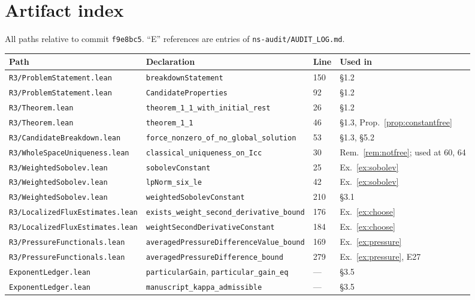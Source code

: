 \documentclass[11pt]{article}
\newcommand{\ct}[1]{\texttt{#1}}
\newcommand{\file}[1]{\texttt{\small #1}}
\theoremstyle{plain}
\theoremstyle{definition}
\theoremstyle{remark}
\begin{document}
\appendix
\section{Artifact index}

All paths relative to commit \texttt{f9e8bc5}. ``E'' references are entries of
\file{ns-audit/AUDIT\_LOG.md}.

\begin{center}
\small
\begin{tabular}{@{}llll@{}}
\toprule
Path & Declaration & Line & Used in \\
\midrule
\file{R3/ProblemStatement.lean} & \ct{breakdownStatement} & 150 & \S1.2 \\
\file{R3/ProblemStatement.lean} & \ct{CandidateProperties} & 92 & \S1.2 \\
\file{R3/Theorem.lean} & \ct{theorem\_1\_1\_with\_initial\_rest} & 26 & \S1.2 \\
\file{R3/Theorem.lean} & \ct{theorem\_1\_1} & 46 & \S1.3, Prop.~\ref{prop:constantfree} \\
\file{R3/CandidateBreakdown.lean} & \ct{force\_nonzero\_of\_no\_global\_solution} & 53 & \S1.3, \S5.2 \\
\file{R3/WholeSpaceUniqueness.lean} & \ct{classical\_uniqueness\_on\_Icc} & 30 & Rem.~\ref{rem:notfree}; used at 60, 64 \\
\file{R3/WeightedSobolev.lean} & \ct{sobolevConstant} & 25 & Ex.~\ref{ex:sobolev} \\
\file{R3/WeightedSobolev.lean} & \ct{lpNorm\_six\_le} & 42 & Ex.~\ref{ex:sobolev} \\
\file{R3/WeightedSobolev.lean} & \ct{weightedSobolevConstant} & 210 & \S3.1 \\
\file{R3/LocalizedFluxEstimates.lean} & \ct{exists\_weight\_second\_derivative\_bound} & 176 & Ex.~\ref{ex:choose} \\
\file{R3/LocalizedFluxEstimates.lean} & \ct{weightSecondDerivativeConstant} & 184 & Ex.~\ref{ex:choose} \\
\file{R3/PressureFunctionals.lean} & \ct{averagedPressureDifferenceValue\_bound} & 169 & Ex.~\ref{ex:pressure} \\
\file{R3/PressureFunctionals.lean} & \ct{averagedPressureDifference\_bound} & 279 & Ex.~\ref{ex:pressure}, E27 \\
\file{ExponentLedger.lean} & \ct{particularGain}, \ct{particular\_gain\_eq} & --- & \S3.5 \\
\file{ExponentLedger.lean} & \ct{manuscript\_kappa\_admissible} & --- & \S3.5 \\

\end{tabular}
\end{center}
\end{document}
